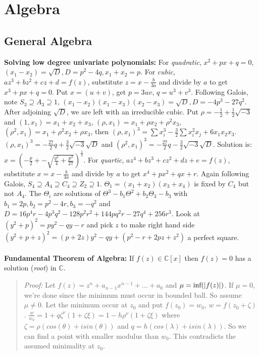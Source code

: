 \section{Algebra}
\subsection{General Algebra}
{\bf Solving low degree univariate polynomials:}
For \emph{quadratic},  $x^2+px+q=0$, $(x_1-x_2)= {\sqrt D}, D= p^2-4q, x_1+x_2=p$.
For \emph{cubic}, $az^3 + bz^2 + cz + d= f(z)$, substitute $z= x - {\frac {b} {3a}}$ and
divide by $a$ to get $x^3+ px+ q= 0$.  Put $x= (u+v)$, get $p=3uv$,
$q= u^3 + v^3$.  Following Galois, note $S_3 \supseteq A_3 \supseteq 1$,
$(x_1 -x_2)(x_1-x_3)(x_2-x_3)= {\sqrt D}, D= -4p^3-27q^2$.  After adjoining
${\sqrt D}$, we are left with an irreducible cubic.  Put $\rho=
-{\frac 1 2} + {\frac 1 2} {\sqrt {-3}}$ and 
$(1,x_1 )= x_1 +x_2 + x_3$, $(\rho, x_1 )= x_1 + \rho x_2 + \rho^2 x_3$,
$(\rho^2, x_1 )= x_1 + \rho^2 x_2 + \rho x_3$, then
$(\rho, x_1 )^3= \sum x_i^3  - {\frac 3 2} \sum x_i^2 x_j + 6 x_1 x_2 x_3$.
$(\rho, x_1 )^3= - {\frac {27} {2}}q + {\frac 3 2} {\sqrt {-3}} {\sqrt {D}}$ and
$(\rho^2, x_1 )^3= - {\frac {27} {2}}q - {\frac 3 2} {\sqrt {-3}} {\sqrt {D}}$.
Solution is:
$x= ({-{\frac {p} {2}} +- {\sqrt {{\frac{q^2} {4}} + {\frac {p^3} {27}}}}})^{\frac {1} {3}}$.  
For \emph{quartic}, $az^4 + bz^3 + cz^2 + dz+e= f(z)$, 
substitute $x= x - {\frac {b} {4a}}$ and
divide by $a$ to get $x^4+ px^2 + qx + r$.  Again following Galois,
$S_4 \supseteq A_4 \supseteq C_4 \supseteq Z_2 \supseteq 1$.  
$\Theta_1 = (x_1+x_2)(x_3+x_4)$ is fixed by $C_4$ but not $A_4$.
The $\Theta_i$ are solutions of $\Theta^3 -b_1 \Theta^2 + b_2 \Theta_3 -b_3$ with
$b_1= 2p, b_2= p^2-4r, b_3= -q^2$ and
$D=16 p^4r-4p^3q^2-128p^2r^2+144 p q^2r -27 q^4 +256 r^3$.
Look at
$(y^2 + p)^2 = py^2 -qy -r$ and pick $z$ to make right hand side
$(y^2 + p + z)^2 = (p+2z)y^2 -qy + (p^2 -r +2pz + z^2 )$ a perfect square.
\\
\\
{\bf Fundamental Theorem of Algebra:}  If $f(z) \in {\mathbb C}[x]$ then $f(z)=0$
has a solution (\emph{root}) in ${\mathbb C}$.
\begin{quote}
\emph{Proof:}
Let $f(z)= z^n+ a_{n-1} x^{n-1} + ... + a_0$ and 
$\mu= \textnormal{inf}(|f(z)|)$.   If 
$\mu = 0$, we're done since the minimum must occur in bounded ball.  So assume
$\mu \ne 0$.  Let the minimum occur at $z_{0}$ and put
$f(z_{0})= w_{0}$,
$w=f(z_{0}+ \zeta)$.  ${\frac {w} {w_{0}}}= 1+q \zeta^{\nu}(1+\zeta \xi)=
1-h \rho^{\nu}(1+ \zeta \xi)$ where $\zeta= \rho (cos(\theta) + i sin(\theta))$ and
$q= h(cos(\lambda) + i sin(\lambda))$.  So we can find a point with smaller modulus than
$w_0$.  This contradicts the assumed minimality at $z_0$.
\end{quote}
